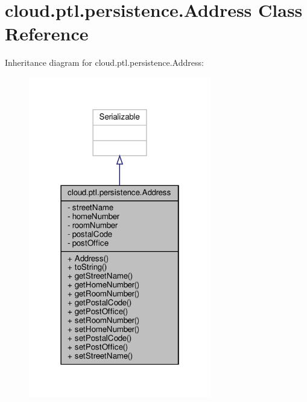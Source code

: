 \hypertarget{classcloud_1_1ptl_1_1persistence_1_1Address}{}\section{cloud.\+ptl.\+persistence.\+Address Class Reference}
\label{classcloud_1_1ptl_1_1persistence_1_1Address}


Inheritance diagram for cloud.\+ptl.\+persistence.\+Address\+:
\nopagebreak
\begin{figure}[H]
\begin{center}
\leavevmode
\includegraphics[width=226pt]{classcloud_1_1ptl_1_1persistence_1_1Address__inherit__graph}
\end{center}
\end{figure}


